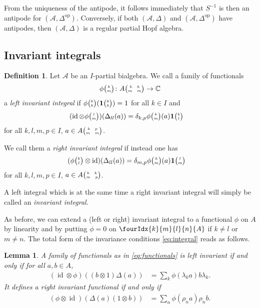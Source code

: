 \documentclass[11pt]{article}
\DeclareMathOperator{\id}{id}
\DeclareMathOperator{\op}{\mathrm{op}}
\newcommand{\C}{\mathbb{C}}
\newcommand{\Grt}[3]{#1{\tiny {\begin{pmatrix} #2\\#3\end{pmatrix}}}}
\newcommand{\UnitC}[2]{\Grt{\mathbf{1}}{#1}{#2}}
\newcommand{\pmat}[4]{{\tiny \begin{pmatrix} #1 \quad #2 \\ #3 \quad #4\end{pmatrix}}}
\newcommand{\Gr}[5]{\fourIdx{#2}{#4}{#3}{#5}{#1}}%
\newtheorem{Lem}[Theorem]{Lemma}
\theoremstyle{definition}
\newtheorem{Def}[Theorem]{Definition}
\newcommand{\phic}[2]{\Grt{\phi}{#1}{#2}}
\numberwithin{equation}{section}
\begin{document}
From the uniqueness of the antipode, it follows immediately that $S^{-1}$ is then an antipode for $(\mathscr{A},\Delta^{\op})$. Conversely, if both $(\mathscr{A},\Delta)$ and $(\mathscr{A},\Delta^{\op})$ have antipodes, then $(\mathscr{A},\Delta)$ is a regular partial Hopf algebra. 

\subsection{Invariant integrals}


\begin{Def}
  Let $\mathscr{A}$ be an $I$-partial bialgebra.  We call a family of
  functionals
\begin{align} \label{eq:functionals}
  \phic{k}{m} \colon A\pmat{k}{k}{m}{m} \to \C
\end{align}
a \emph{left invariant} \emph{integral} if
 $\phic{k}{k}(\UnitC{k}{k})=1$ for all $k\in
I$ and
\begin{align}
  \label{eq:integral}
   (\id \otimes \phic{l}{m})(\Delta_{ll}(a)) 
&= \delta_{k,p} \phic{k}{m}(a)
  \UnitC{k}{l} 
\end{align}
 for all $k,l,m,p\in I$, $a \in A\pmat{k}{p}{m}{m}$. 
 
 We call them a \emph{right invariant}  \emph{integral} if instead one has \begin{align}
  (\phic{k}{l} \otimes
  \id)(\Delta_{ll}(a))&= \delta_{m,p} \phic{k}{m}(a) \UnitC{l}{m}\end{align}
 for all $k,l,m,p\in I$, $a \in A\pmat{k}{k}{m}{p}$. 
 
 A left integral which is at the same time a right invariant integral will simply be called an \emph{invariant integral}.
\end{Def}

As before, we can extend a (left or right) invariant integral to a functional $\phi$ on $A$ by linearity and by putting $\phi=0$ on $\Gr{A}{k}{l}{m}{n}$ if $k\neq l$ or $m\neq n$. The total form of the invariance conditions
\eqref{eq:integral}  reads as follows. 

\begin{Lem} \label{lemma:total-integral}
  A family of functionals  as in   \eqref{eq:functionals}
  is left invariant
  if and only if
for all $a,b\in A$,
  \begin{align*}
(\id\otimes \phi)((b\otimes 1)\Delta(a)) &= \sum_{k}\phi(\lambda_{k}a)b\lambda_k.
      \end{align*}
      It defines a right invariant functional if and only if 
   \begin{align*}   (\phi\otimes \id)(\Delta(a)(1\otimes b)) &= \sum_{n}
\phi(\rho_{n} a)\rho_n b.\end{align*}
\end{Lem}
\end{document}
